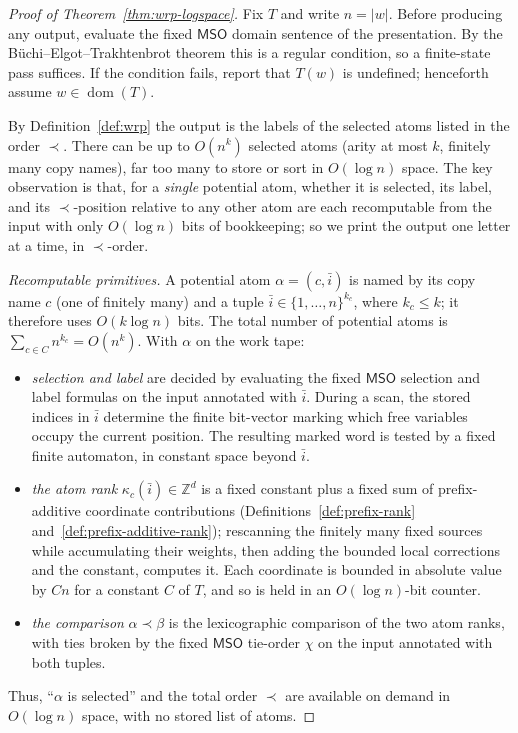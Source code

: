 \documentclass[11pt]{article}
\theoremstyle{definition}
\newcommand{\Z}{\mathbb Z}
\newcommand{\MSO}{\mathsf{MSO}}
\begin{document}
\begin{proof}[Proof of Theorem~\ref{thm:wrp-logspace}]
Fix $T$ and write $n=|w|$.  Before producing any output, evaluate the fixed
$\MSO$ domain sentence of the presentation.  By the
B\"uchi--Elgot--Trakhtenbrot theorem this is a regular condition, so a
finite-state pass suffices.  If the condition fails, report that $T(w)$ is
undefined; henceforth assume $w\in\operatorname{dom}(T)$.

By Definition~\ref{def:wrp} the output is the
labels of the selected atoms listed in the order $\prec$.  There can be up to
$O(n^k)$ selected atoms (arity at most $k$, finitely many copy names), far too many
to store or sort in $O(\log n)$ space.  The key observation is that, for a
\emph{single}
potential atom, whether it is selected, its label, and its $\prec$-position
relative to any other atom are each recomputable from the input with only
$O(\log n)$ bits of bookkeeping; so we print the output one letter at a time,
in $\prec$-order.

\vspace{0.5em}
\noindent\emph{Recomputable primitives.}
A potential atom $\alpha=(c,\bar i)$ is named by its copy name $c$ (one of
finitely many) and a tuple $\bar i\in\{1,\ldots,n\}^{k_c}$, where $k_c\le k$; it
therefore uses $O(k\log n)$ bits.  The total number of potential atoms is
$\sum_{c\in C}n^{k_c}=O(n^k)$.  With $\alpha$ on the work tape:
\begin{itemize}
\item \emph{selection and label} are decided by evaluating the fixed $\MSO$
selection and label formulas on the input annotated with $\bar i$.  During a
scan, the stored indices in $\bar i$ determine the finite bit-vector marking
which free variables occupy the current position.  The resulting marked word
is tested by a fixed finite automaton, in constant space beyond $\bar i$.
\item \emph{the atom rank} $\kappa_c(\bar i)\in\Z^d$ is a fixed constant plus a
fixed sum of prefix-additive coordinate contributions
(Definitions~\ref{def:prefix-rank} and~\ref{def:prefix-additive-rank});
rescanning the finitely many fixed sources while accumulating their weights,
then adding the bounded local corrections and the constant, computes it.  Each
coordinate is bounded in absolute value by $Cn$ for a constant $C$ of $T$, and
so is held in an $O(\log n)$-bit counter.
\item \emph{the comparison} $\alpha\prec\beta$ is the lexicographic comparison
of the two atom ranks, with ties broken by the fixed $\MSO$ tie-order $\chi$ on the
input annotated with both tuples.
\end{itemize}
Thus, ``$\alpha$ is selected'' and the total order $\prec$ are available on
demand in $O(\log n)$ space, with no stored list of atoms.


\end{proof}
\end{document}
